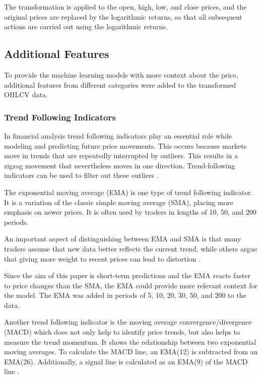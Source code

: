 \noindent
The transformation is applied to the open, high, low, and close prices, and the original prices are replaced by the logarithmic returns, so that all subsequent actions are carried out using the logarithmic returns.

\subsection{Additional Features}
\label{chap:additional-features}

To provide the machine learning models with more context about the price, additional features from different categories were added to the transformed OHLCV data.

\subsubsection{Trend Following Indicators}

In financial analysis trend following indicators play an essential role while modeling and predicting future price movements.
This occurs because markets move in trends that are repeatedly interrupted by outliers.
This results in a zigzag movement that nevertheless moves in one direction.
Trend-following indicators can be used to filter out these outliers \cite{investopia-trend-indicators}.

The exponential moving average (EMA) is one type of trend following indicator.
It is a variation of the classic simple moving average (SMA), placing more emphasis on newer prices.
It is often used by traders in lengths of 10, 50, and 200 periods.

An important aspect of distinguishing between EMA and SMA is that many traders assume that new data better reflects the current trend, while others argue that giving more weight to recent prices can lead to distortion
\cite{investopia-ema}.

Since the aim of this paper is short-term predictions and the EMA reacts faster to price changes than the SMA, the EMA could provide more relevant context for the model.
The EMA was added in periods of 5, 10, 20, 30, 50, and 200 to the data.

Another trend following indicator is the moving average convergence/divergence \\(MACD) which does not only help to identify price trends, but also helps to measure the trend momentum.
It shows the relationship between two exponential moving averages.
To calculate the MACD line, an EMA(12) is subtracted from an EMA(26).
Additionally, a signal line is calculated as an EMA(9) of the MACD line \cite{investopia-macd}.



